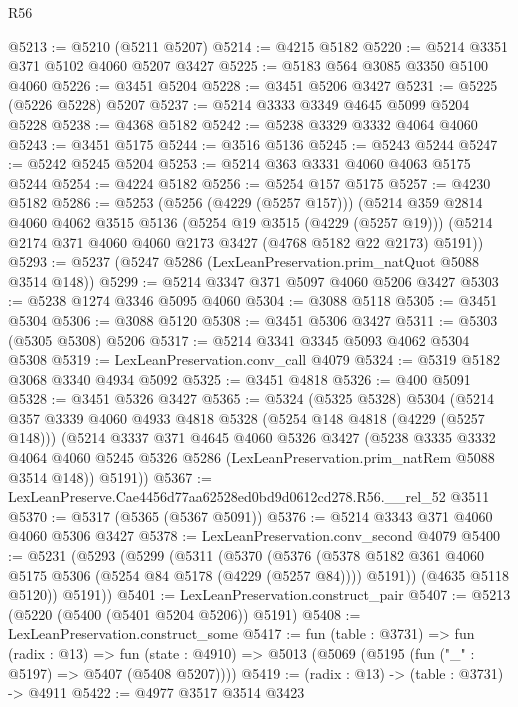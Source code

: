 \begin{lexlean}{R56}
\begin{coremodule}
@5213 := @5210 (@5211 @5207)
@5214 := @4215 @5182
@5220 := @5214 @3351 @371 @5102 @4060 @5207 @3427
@5225 := @5183 @564 @3085 @3350 @5100 @4060
@5226 := @3451 @5204
@5228 := @3451 @5206 @3427
@5231 := @5225 (@5226 @5228) @5207
@5237 := @5214 @3333 @3349 @4645 @5099 @5204 @5228
@5238 := @4368 @5182
@5242 := @5238 @3329 @3332 @4064 @4060
@5243 := @3451 @5175
@5244 := @3516 @5136
@5245 := @5243 @5244
@5247 := @5242 @5245 @5204
@5253 := @5214 @363 @3331 @4060 @4063 @5175 @5244
@5254 := @4224 @5182
@5256 := @5254 @157 @5175
@5257 := @4230 @5182
@5286 := @5253
    (@5256 (@4229 (@5257 @157)))
    (@5214
      @359
      @2814
      @4060
      @4062
      @3515
      @5136
      (@5254 @19 @3515 (@4229 (@5257 @19)))
      (@5214 @2174 @371 @4060 @4060 @2173 @3427 (@4768 @5182 @22 @2173) @5191))
@5293 := @5237 (@5247 @5286 (LexLeanPreservation.prim_natQuot @5088 @3514 @148))
@5299 := @5214 @3347 @371 @5097 @4060 @5206 @3427
@5303 := @5238 @1274 @3346 @5095 @4060
@5304 := @3088 @5118
@5305 := @3451 @5304
@5306 := @3088 @5120
@5308 := @3451 @5306 @3427
@5311 := @5303 (@5305 @5308) @5206
@5317 := @5214 @3341 @3345 @5093 @4062 @5304 @5308
@5319 := LexLeanPreservation.conv_call @4079
@5324 := @5319 @5182 @3068 @3340 @4934 @5092
@5325 := @3451 @4818
@5326 := @400 @5091
@5328 := @3451 @5326 @3427
@5365 := @5324
    (@5325 @5328)
    @5304
    (@5214
      @357
      @3339
      @4060
      @4933
      @4818
      @5328
      (@5254 @148 @4818 (@4229 (@5257 @148)))
      (@5214
        @3337
        @371
        @4645
        @4060
        @5326
        @3427
        (@5238
          @3335
          @3332
          @4064
          @4060
          @5245
          @5326
          @5286
          (LexLeanPreservation.prim_natRem @5088 @3514 @148))
        @5191))
@5367 := LexLeanPreserve.Cae4456d77aa62528ed0bd9d0612cd278.R56.__rel_52 @3511
@5370 := @5317 (@5365 (@5367 @5091))
@5376 := @5214 @3343 @371 @4060 @4060 @5306 @3427
@5378 := LexLeanPreservation.conv_second @4079
@5400 := @5231
    (@5293
      (@5299
        (@5311
          (@5370
            (@5376
              (@5378 @5182 @361 @4060 @5175 @5306 (@5254 @84 @5178 (@4229 (@5257 @84))))
              @5191))
          (@4635 @5118 @5120))
        @5191))
@5401 := LexLeanPreservation.construct_pair
@5407 := @5213 (@5220 (@5400 (@5401 @5204 @5206)) @5191)
@5408 := LexLeanPreservation.construct_some
@5417 := fun (table : @3731) =>
  fun (radix : @13) =>
  fun (state : @4910) => @5013 (@5069 (@5195 (fun ("_" : @5197) => @5407 (@5408 @5207))))
@5419 := (radix : @13) -> (table : @3731) -> @4911
@5422 := @4977 @3517 @3514 @3423

\end{coremodule}
\end{lexlean}
